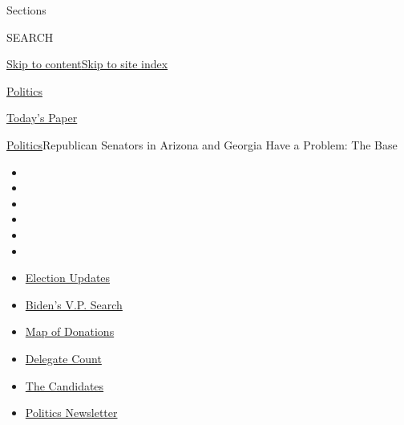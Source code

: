 Sections

SEARCH

\protect\hyperlink{site-content}{Skip to
content}\protect\hyperlink{site-index}{Skip to site index}

\href{https://www.nytimes.com/section/politics}{Politics}

\href{https://myaccount.nytimes.com/auth/login?response_type=cookie\&client_id=vi}{}

\href{https://www.nytimes.com/section/todayspaper}{Today's Paper}

\href{/section/politics}{Politics}\textbar{}Republican Senators in
Arizona and Georgia Have a Problem: The Base

\begin{itemize}
\item
\item
\item
\item
\item
\item
\end{itemize}

\begin{itemize}
\item
  \href{https://www.nytimes.com/2020/07/31/us/elections/biden-vs-trump.html?action=click\&pgtype=Article\&state=default\&region=TOP_BANNER\&context=storylines_menu}{Election
  Updates}
\item
  \href{https://www.nytimes.com/article/biden-vice-president-2020.html?action=click\&pgtype=Article\&state=default\&region=TOP_BANNER\&context=storylines_menu}{Biden's
  V.P. Search}
\item
  \href{https://www.nytimes.com/interactive/2020/07/24/us/politics/trump-biden-campaign-donors.html?action=click\&pgtype=Article\&state=default\&region=TOP_BANNER\&context=storylines_menu}{Map
  of Donations}
\item
  \href{https://www.nytimes.com/interactive/2020/us/elections/delegate-count-primary-results.html?action=click\&pgtype=Article\&state=default\&region=TOP_BANNER\&context=storylines_menu}{Delegate
  Count}
\item
  \href{https://www.nytimes.com/interactive/2019/us/politics/2020-presidential-candidates.html?action=click\&pgtype=Article\&state=default\&region=TOP_BANNER\&context=storylines_menu}{The
  Candidates}
\item
  \href{https://www.nytimes.com/newsletters/politics?action=click\&pgtype=Article\&state=default\&region=TOP_BANNER\&context=storylines_menu}{Politics
  Newsletter}
\end{itemize}

